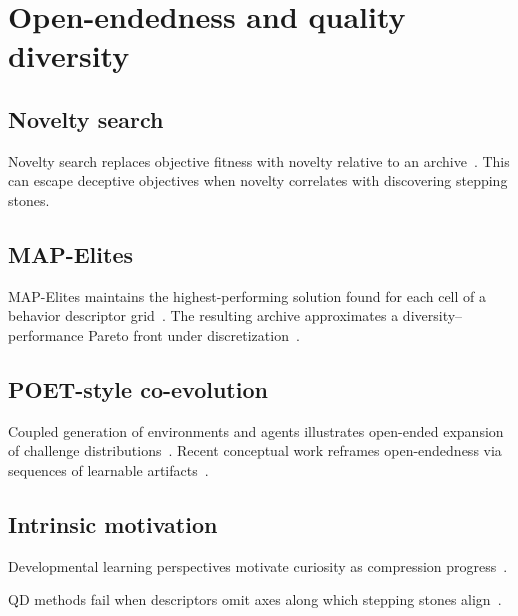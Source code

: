 \section{Open-endedness and quality diversity}
\label{sec:oe}

\subsection{Novelty search}
Novelty search replaces objective fitness with novelty relative to an archive~\cite{lehman2011novelty}.
This can escape deceptive objectives when novelty correlates with discovering stepping stones.

\subsection{MAP-Elites}
MAP-Elites maintains the highest-performing solution found for each cell of a behavior descriptor grid~\cite{mouret2015illuminating}.
The resulting archive approximates a diversity--performance Pareto front under discretization~\cite{pugh2016quality}.

\subsection{POET-style co-evolution}
Coupled generation of environments and agents illustrates open-ended expansion of challenge distributions~\cite{wang2019paired}.
Recent conceptual work reframes open-endedness via sequences of learnable artifacts~\cite{hughes2024open}.

\subsection{Intrinsic motivation}
Developmental learning perspectives motivate curiosity as compression progress~\cite{oudeyer2007intrinsic}.

\begin{remark}
QD methods fail when descriptors omit axes along which stepping stones align~\cite{ecoffet2019go}.
\end{remark}
